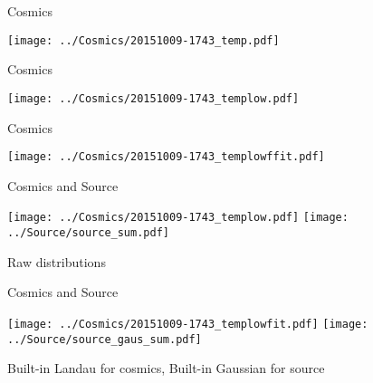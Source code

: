 \documentclass[compress,8pt]{beamer} %
\begin{document}
\begin{frame}{Cosmics}
\begin{adjustwidth}{-2em}{-2em}
\begin{center}
\texttt{[image: ../Cosmics/20151009-1743\_temp.pdf]}
\end{center}
\end{adjustwidth}
\end{frame}



\begin{frame}{Cosmics}
\begin{adjustwidth}{-2em}{-2em}
\begin{center}
\texttt{[image: ../Cosmics/20151009-1743\_templow.pdf]}
\end{center}
\end{adjustwidth}
\end{frame}



\begin{frame}{Cosmics}
\begin{adjustwidth}{-2em}{-2em}
\begin{center}
\texttt{[image: ../Cosmics/20151009-1743\_templowffit.pdf]}
\end{center}
\end{adjustwidth}
\end{frame}



\begin{frame}{Cosmics and Source}
\begin{adjustwidth}{-2em}{-2em}
\begin{center}
\texttt{[image: ../Cosmics/20151009-1743\_templow.pdf]}
\texttt{[image: ../Source/source\_sum.pdf]}
\end{center}
\end{adjustwidth}
Raw distributions
\end{frame}



\begin{frame}{Cosmics and Source}
\begin{adjustwidth}{-2em}{-2em}
\begin{center}
\texttt{[image: ../Cosmics/20151009-1743\_templowfit.pdf]}
\texttt{[image: ../Source/source\_gaus\_sum.pdf]}
\end{center}
\end{adjustwidth}
Built-in Landau for cosmics, Built-in Gaussian for source
\end{frame}
\end{document}
